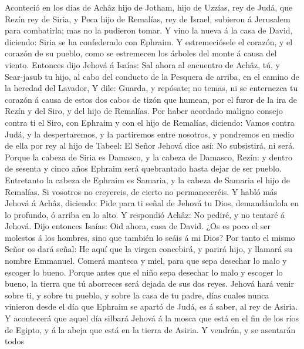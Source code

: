  Aconteció en los días de Achâz hijo de Jotham, hijo de
Uzzías, rey de Judá, que Rezín rey de Siria, y Peca hijo de Remalías,
rey de Israel, subieron á Jerusalem para combatirla; mas no la pudieron
tomar.  Y vino la nueva á la casa de David, diciendo:
Siria se ha confederado con Ephraim. Y estremeciósele el corazón, y el
corazón de su pueblo, como se estremecen los árboles del monte á causa
del viento.  Entonces dijo Jehová á Isaías: Sal ahora al
encuentro de Achâz, tú, y Sear-jasub tu hijo, al cabo del conducto de la
Pesquera de arriba, en el camino de la heredad del Lavador,
 Y dile: Guarda, y repósate; no temas, ni se enternezca tu
corazón á causa de estos dos cabos de tizón que humean, por el furor de
la ira de Rezín y del Siro, y del hijo de Remalías.  Por
haber acordado maligno consejo contra ti el Siro, con Ephraim y con el
hijo de Remalías, diciendo:  Vamos contra Judá, y la
despertaremos, y la partiremos entre nosotros, y pondremos en medio de
ella por rey al hijo de Tabeel:  El Señor Jehová dice así:
No subsistirá, ni será.  Porque la cabeza de Siria es
Damasco, y la cabeza de Damasco, Rezín: y dentro de sesenta y cinco años
Ephraim será quebrantado hasta dejar de ser pueblo. 
Entretanto la cabeza de Ephraim es Samaria, y la cabeza de Samaria el
hijo de Remalías. Si vosotros no creyereis, de cierto no permaneceréis.
 Y habló más Jehová á Achâz, diciendo: 
Pide para ti señal de Jehová tu Dios, demandándola en lo profundo, ó
arriba en lo alto.  Y respondió Achâz: No pediré, y no
tentaré á Jehová.  Dijo entonces Isaías: Oid ahora, casa
de David. ¿Os es poco el ser molestos á los hombres, sino que también lo
seáis á mi Dios?  Por tanto el mismo Señor os dará señal:
He aquí que la virgen concebirá, y parirá hijo, y llamará su nombre
Emmanuel.  Comerá manteca y miel, para que sepa desechar
lo malo y escoger lo bueno.  Porque antes que el niño
sepa desechar lo malo y escoger lo bueno, la tierra que tú aborreces
será dejada de sus dos reyes.  Jehová hará venir sobre
ti, y sobre tu pueblo, y sobre la casa de tu padre, días cuales nunca
vinieron desde el día que Ephraim se apartó de Judá, es á saber, al rey
de Asiria.  Y acontecerá que aquel día silbará Jehová á
la mosca que está en el fin de los ríos de Egipto, y á la abeja que está
en la tierra de Asiria.  Y vendrán, y se asentarán todos
